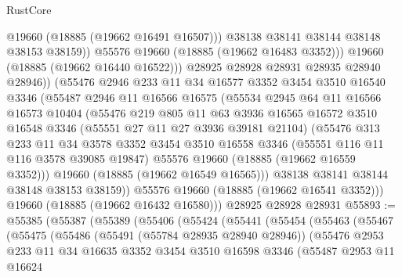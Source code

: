 \begin{lexlean}{RustCore}
\begin{coremodule}
                    @19660
                    (@18885 (@19662 @16491 @16507)))
                  @38138
                  @38141
                  @38144
                  @38148
                  @38153
                  @38159))
              @55576
              @19660
              (@18885 (@19662 @16483 @3352)))
            @19660
            (@18885 (@19662 @16440 @16522)))
          @28925
          @28928
          @28931
          @28935
          @28940
          @28946))
      (@55476
        @2946
        @233
        @11
        @34
        @16577
        @3352
        @3454
        @3510
        @16540
        @3346
        (@55487
          @2946
          @11
          @16566
          @16575
          (@55534
            @2945
            @64
            @11
            @16566
            @16573
            @10404
            (@55476
              @219
              @805
              @11
              @63
              @3936
              @16565
              @16572
              @3510
              @16548
              @3346
              (@55551 @27 @11 @27 @3936 @39181 @21104)
              (@55476
                @313
                @233
                @11
                @34
                @3578
                @3352
                @3454
                @3510
                @16558
                @3346
                (@55551 @116 @11 @116 @3578 @39085 @19847)
                @55576
                @19660
                (@18885 (@19662 @16559 @3352)))
              @19660
              (@18885 (@19662 @16549 @16565)))
            @38138
            @38141
            @38144
            @38148
            @38153
            @38159))
        @55576
        @19660
        (@18885 (@19662 @16541 @3352)))
      @19660
      (@18885 (@19662 @16432 @16580)))
    @28925
    @28928
    @28931
@55893 := @55385
    (@55387
      (@55389
        (@55406
          (@55424
            (@55441
              (@55454
                (@55463
                  (@55467
                    (@55475
                      (@55486
                        (@55491 (@55784 @28935 @28940 @28946))
                        (@55476
                          @2953
                          @233
                          @11
                          @34
                          @16635
                          @3352
                          @3454
                          @3510
                          @16598
                          @3346
                          (@55487
                            @2953
                            @11
                            @16624

\end{coremodule}
\end{lexlean}
